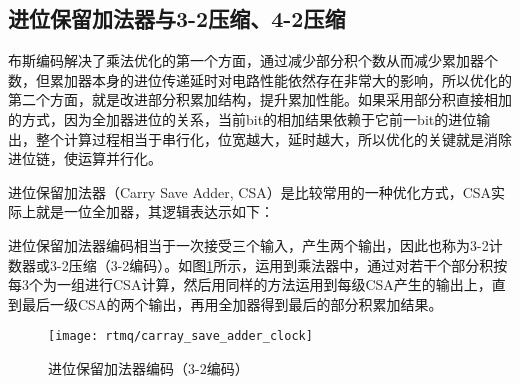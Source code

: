 \subsection[进位保留加法器与3-2压缩、4-2压缩]{进位保留加法器与3-2压缩、4-2压缩}
布斯编码解决了乘法优化的第一个方面，通过减少部分积个数从而减少累加器个数，但累加器本身的进位传递延时对电路性能依然存在非常大的影响，所以优化的第二个方面，就是改进部分积累加结构，提升累加性能。如果采用部分积直接相加的方式，因为全加器进位的关系，当前bit的相加结果依赖于它前一bit的进位输出，整个计算过程相当于串行化，位宽越大，延时越大，所以优化的关键就是消除进位链，使运算并行化。

进位保留加法器（Carry Save Adder, CSA）是比较常用的一种优化方式，CSA实际上就是一位全加器，其逻辑表达示如下：


进位保留加法器编码相当于一次接受三个输入，产生两个输出，因此也称为3-2计数器或3-2压缩（3-2编码）。如图\ref{fig:carray_save_adder_clock}所示，运用到乘法器中，通过对若干个部分积按每3个为一组进行CSA计算，然后用同样的方法运用到每级CSA产生的输出上，直到最后一级CSA的两个输出，再用全加器得到最后的部分积累加结果。
\begin{figure}
    \centering
    \caption[进位保留加法器编码（3-2编码）]{进位保留加法器编码（3-2编码）\label{fig:carray_save_adder_clock}}
    \texttt{[image: rtmq/carray\_save\_adder\_clock]}
\end{figure}

